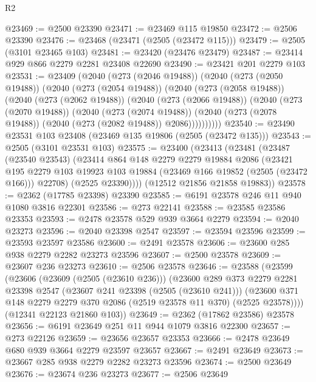 \begin{lexlean}{R2}
\begin{coremodule}
@23469 := @2500 @23390
@23471 := @23469 @115 @19850
@23472 := @2506 @23390
@23476 := @23468 (@23471 (@2505 (@23472 @115)))
@23479 := @2505 (@3101 @23465 @103)
@23481 := @23420 (@23476 @23479)
@23487 := @23414 @929 @866 @2279 @2281 @23408 @22690
@23490 := @23421 @201 @2279 @103
@23531 := @23409
    (@2040
      (@273 (@2046 @19488))
      (@2040
        (@273 (@2050 @19488))
        (@2040
          (@273 (@2054 @19488))
          (@2040
            (@273 (@2058 @19488))
            (@2040
              (@273 (@2062 @19488))
              (@2040
                (@273 (@2066 @19488))
                (@2040
                  (@273 (@2070 @19488))
                  (@2040
                    (@273 (@2074 @19488))
                    (@2040 (@273 (@2078 @19488)) (@2040 (@273 (@2082 @19488)) @2086))))))))))
@23540 := @23490 @23531 @103 @23408 (@23469 @135 @19806 (@2505 (@23472 @135)))
@23543 := @2505 (@3101 @23531 @103)
@23575 := @23400
    (@23413
      (@23481
        (@23487
          (@23540 @23543)
          (@23414
            @864
            @148
            @2279
            @2279
            @19884
            @2086
            (@23421
              @195
              @2279
              @103
              @19923
              @103
              @19884
              (@23469 @166 @19852 (@2505 (@23472 @166)))
              @22708)
            (@2525 @23390))))
      (@12512 @21856 @21858 @19883))
@23578 := @2362 (@17785 @23398) @23390
@23585 := @6191 @23578 @246 @11 @940 @1080 @3816 @22301
@23586 := @273 @22141
@23588 := @23585 @23586 @23353
@23593 := @2478 @23578 @529 @939 @3664 @2279
@23594 := @2040 @23273
@23596 := @2040 @23398 @2547
@23597 := @23594 @23596
@23599 := @23593 @23597 @23586
@23600 := @2491 @23578
@23606 := @23600 @285 @938 @2279 @2282 @23273 @23596
@23607 := @2500 @23578
@23609 := @23607 @236 @23273
@23610 := @2506 @23578
@23646 := @23588
    (@23599
      (@23606
        (@23609 (@2505 (@23610 @236)))
        (@23600
          @289
          @373
          @2279
          @2281
          @23398
          @2547
          (@23607 @241 @23398 (@2505 (@23610 @241)))
          (@23600 @371 @148 @2279 @2279 @370 @2086 (@2519 @23578 @11 @370) (@2525 @23578))))
      (@12341 @22123 @21860 @103))
@23649 := @2362 (@17862 @23586) @23578
@23656 := @6191 @23649 @251 @11 @944 @1079 @3816 @22300
@23657 := @273 @22126
@23659 := @23656 @23657 @23353
@23666 := @2478 @23649 @680 @939 @3664 @2279 @23597 @23657
@23667 := @2491 @23649
@23673 := @23667 @285 @938 @2279 @2282 @23273 @23596
@23674 := @2500 @23649
@23676 := @23674 @236 @23273
@23677 := @2506 @23649

\end{coremodule}
\end{lexlean}
